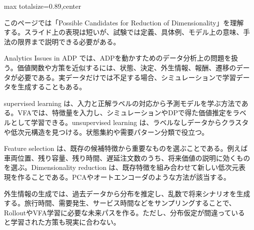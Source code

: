 \begin{minipage}[t]{0.58\textwidth}
\begin{adjustbox}{max totalsize={\textwidth}{0.89\textheight},center}
\begin{minipage}{\textwidth}\scriptsize
{}このページでは「Possible Candidates for Reduction of Dimensionality」を理解する。スライド上の表現は短いが、試験では定義、具体例、モデル上の意味、手法の限界まで説明できる必要がある。\par
Analytics Issues in ADP では、ADPを動かすためのデータ分析上の問題を扱う。価値関数や方策を近似するには、状態、決定、外生情報、報酬、遷移のデータが必要である。実データだけでは不足する場合、シミュレーションで学習データを生成することもある。\par
supervised learning は、入力と正解ラベルの対応から予測モデルを学ぶ方法である。VFAでは、特徴量を入力し、シミュレーションやDPで得た価値推定をラベルとして学習できる。unsupervised learning は、ラベルなしデータからクラスタや低次元構造を見つける。状態集約や需要パターン分類で役立つ。\par
Feature selection は、既存の候補特徴から重要なものを選ぶことである。例えば車両位置、残り容量、残り時間、遅延注文数のうち、将来価値の説明に効くものを選ぶ。Dimensionality reduction は、既存特徴を組み合わせて新しい低次元表現を作ることである。PCAやオートエンコーダのような方法が該当する。\par
外生情報の生成では、過去データから分布を推定し、乱数で将来シナリオを生成する。旅行時間、需要発生、サービス時間などをサンプリングすることで、RolloutやVFA学習に必要な未来パスを作る。ただし、分布仮定が間違っていると学習された方策も現実に合わない。\par

\end{minipage}
\end{adjustbox}
\end{minipage}
